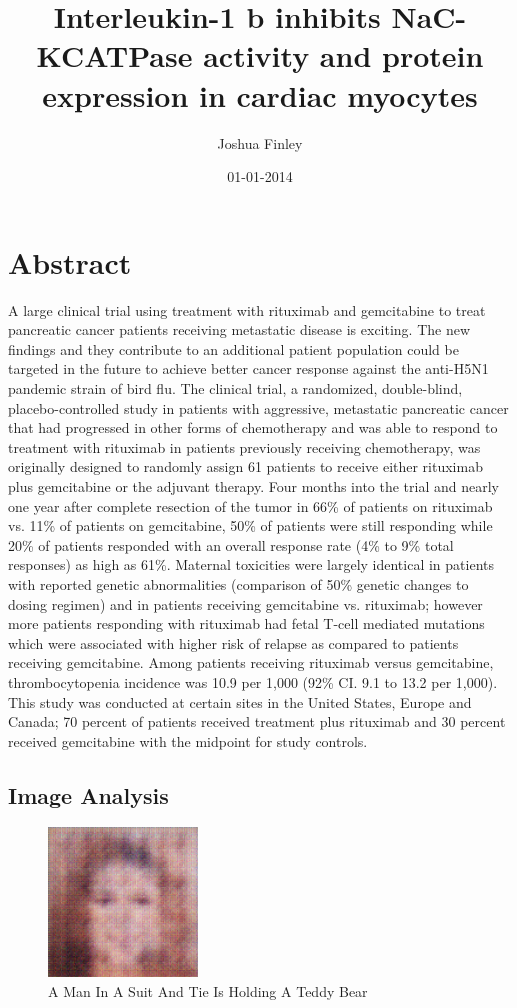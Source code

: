\documentclass{article}%
\title{Interleukin{-}1 b inhibits NaC{-}KCATPase activity and protein expression in cardiac myocytes}%
\author{Joshua Finley}%
\affil{Department of Surgery, Faculty of Medicine, School of Medicine, Kaohsiung Medical University, Kaohsiung, Taiwan}%
\date{01{-}01{-}2014}%
\begin{document}
%
\normalsize%
\maketitle%
\section{Abstract}%
\label{sec:Abstract}%
A large clinical trial using treatment with rituximab and gemcitabine to treat pancreatic cancer patients receiving metastatic disease is exciting. The new findings and they contribute to an additional patient population could be targeted in the future to achieve better cancer response against the anti{-}H5N1 pandemic strain of bird flu.\newline%
The clinical trial, a randomized, double{-}blind, placebo{-}controlled study in patients with aggressive, metastatic pancreatic cancer that had progressed in other forms of chemotherapy and was able to respond to treatment with rituximab in patients previously receiving chemotherapy, was originally designed to randomly assign 61 patients to receive either rituximab plus gemcitabine or the adjuvant therapy. Four months into the trial and nearly one year after complete resection of the tumor in 66\% of patients on rituximab vs. 11\% of patients on gemcitabine, 50\% of patients were still responding while 20\% of patients responded with an overall response rate (4\% to 9\% total responses) as high as 61\%.\newline%
Maternal toxicities were largely identical in patients with reported genetic abnormalities (comparison of 50\% genetic changes to dosing regimen) and in patients receiving gemcitabine vs. rituximab; however more patients responding with rituximab had fetal T{-}cell mediated mutations which were associated with higher risk of relapse as compared to patients receiving gemcitabine. Among patients receiving rituximab versus gemcitabine, thrombocytopenia incidence was 10.9 per 1,000 (92\% CI. 9.1 to 13.2 per 1,000). This study was conducted at certain sites in the United States, Europe and Canada; 70 percent of patients received treatment plus rituximab and 30 percent received gemcitabine with the midpoint for study controls.

%
\subsection{Image Analysis}%
\label{subsec:ImageAnalysis}%


\begin{figure}[h!]%
\centering%
\includegraphics[width=150px]{500_fake_images/samples_5_496.png}%
\caption{A Man In A Suit And Tie Is Holding A Teddy Bear}%
\end{figure}

%
\end{document}

